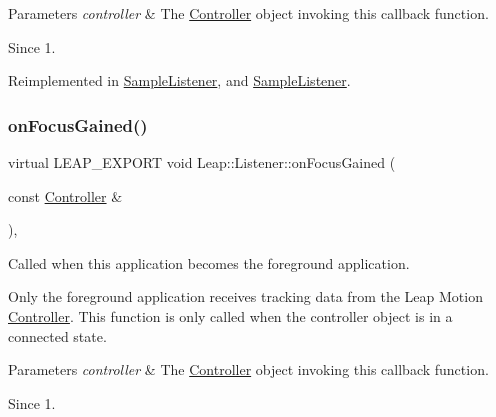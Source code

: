 \begin{DoxyCodeInclude}
\end{DoxyCodeInclude}



\begin{DoxyParams}{Parameters}
{\em controller} & The \hyperlink{class_leap_1_1_controller}{Controller} object invoking this callback function. \\
\hline
\end{DoxyParams}
\begin{DoxySince}{Since}
1. 
\end{DoxySince}


Reimplemented in \hyperlink{class_sample_listener_a60457e8e88223f71c15876f7d27d3bdd}{Sample\+Listener}, and \hyperlink{class_sample_listener_affb615dc62b6936718c40497e819adb7}{Sample\+Listener}.

\mbox{\label{class_leap_1_1_listener_ab52aa99ad9e8fd0f35d9dffc3ef9f027}} 
\subsubsection{\texorpdfstring{on\+Focus\+Gained()}{onFocusGained()}}
{\footnotesize\ttfamily virtual L\+E\+A\+P\+\_\+\+E\+X\+P\+O\+RT void Leap\+::\+Listener\+::on\+Focus\+Gained (\begin{DoxyParamCaption}\item[{const \hyperlink{class_leap_1_1_controller}{Controller} \&}]{ }\end{DoxyParamCaption})\hspace{0.3cm}{\ttfamily [inline]}, {\ttfamily [virtual]}}

Called when this application becomes the foreground application.

Only the foreground application receives tracking data from the Leap Motion \hyperlink{class_leap_1_1_controller}{Controller}. This function is only called when the controller object is in a connected state.


\begin{DoxyCodeInclude}
\end{DoxyCodeInclude}



\begin{DoxyParams}{Parameters}
{\em controller} & The \hyperlink{class_leap_1_1_controller}{Controller} object invoking this callback function. \\
\hline
\end{DoxyParams}
\begin{DoxySince}{Since}
1. 
\end{DoxySince}


